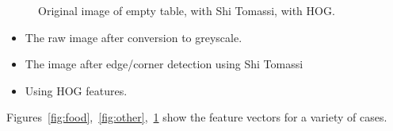\begin{figure}[!h]
\begin{center}
\caption[]{ Original image of empty table,  with Shi Tomassi,
 with HOG.}
\label{fig:empty}
\end{center}
\end{figure}
\begin{itemize}
\item The raw image after conversion to greyscale.
\item The image after edge/corner detection using Shi Tomassi~\cite{shi1994good}
\item Using HOG features.
\end{itemize}

Figures~\ref{fig:food},~\ref{fig:other},~\ref{fig:empty} show the feature vectors for a variety of cases.
